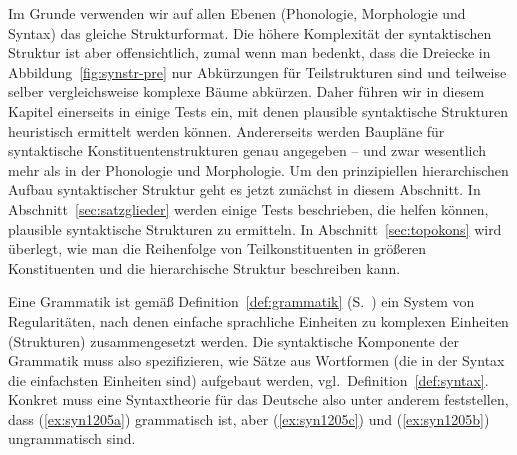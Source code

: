 Im Grunde verwenden wir auf allen Ebenen (Phonologie, Morphologie und Syntax) das gleiche Strukturformat.
Die höhere Komplexität der syntaktischen Struktur ist aber offensichtlich, zumal wenn man bedenkt, dass die Dreiecke in Abbildung~\ref{fig:synstr-pre} nur Abkürzungen für Teilstrukturen sind und teilweise selber vergleichsweise komplexe Bäume abkürzen.
Daher führen wir in diesem Kapitel einerseits in einige Tests ein, mit denen plausible syntaktische Strukturen heuristisch ermittelt werden können.
Andererseits werden Baupläne für syntaktische Konstituentenstrukturen genau angegeben -- und zwar wesentlich mehr als in der Phonologie und Morphologie.
Um den prinzipiellen hierarchischen Aufbau syntaktischer Struktur geht es jetzt zunächst in diesem Abschnitt.
In Abschnitt~\ref{sec:satzglieder} werden einige Tests beschrieben, die helfen können, plausible syntaktische Strukturen zu ermitteln.
In Abschnitt~\ref{sec:topokons} wird überlegt, wie man die Reihenfolge von Teilkonstituenten in größeren Konstituenten und die hierarchische Struktur beschreiben kann.


Eine Grammatik ist gemäß Definition~\ref{def:grammatik} (S.~\pageref{def:grammatik}) ein System von Regularitäten, nach denen einfache sprachliche Einheiten zu komplexen Einheiten (Strukturen) zusammengesetzt werden.
Die syntaktische Komponente der Grammatik muss also spezifizieren, wie Sätze aus Wortformen (die in der Syntax die einfachsten Einheiten sind) aufgebaut werden, vgl.\ Definition~\ref{def:syntax}.
Konkret muss eine Syntaxtheorie für das Deutsche also unter anderem feststellen, dass (\ref{ex:syn1205a}) grammatisch ist, aber (\ref{ex:syn1205c}) und (\ref{ex:syn1205b}) ungrammatisch sind.



\begin{exe}
  \ex\label{ex:syn1205}
  \begin{xlist}
  \end{xlist}
\end{exe}

